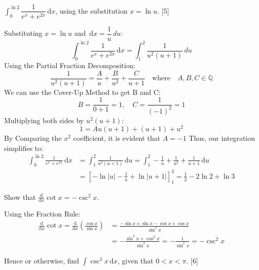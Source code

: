 \documentclass[12pt, a4 paper]{article}
\begin{document}
\begin{outline}[enumerate]
\begin{answer}
\begin{align*}
		\end{align*}
	\end{answer}
	\2 $\int_0^{\ln2} \dfrac{1}{e^x+e^{2x}}\,\mathrm{d}x$, using the substitution $x = \ln u$. \hfill[5]
	\begin{answer}
		Substituting $x=\ln u$ and $\,\mathrm{d}x = \dfrac{1}{u} \,du$:
		\begin{equation*}
			\int_0^{\ln2} \frac{1}{e^x+e^{2x}}\,\mathrm{d}x = \int_1^2 \frac{1}{u^2(u+1)}\,du
		\end{equation*}
		Using the Partial Fraction Decomposition:
		\begin{equation*}
			\frac{1}{u^2(u+1)} = \frac{A}{u} + \frac{B}{u^2} + \frac{C}{u+1} \quad \textrm{where} \quad A,B,C\in\mathbb{Q}
		\end{equation*}
		We can use the Cover-Up Method to get B and C:
		\begin{equation*}
			B = \frac{1}{0+1}=1, \quad C = \frac{1}{(-1)^2} = 1
		\end{equation*}
		Multiplying both sides by $u^2(u+1)$:
		\begin{equation*}
			1 = Au(u+1) + (u+1) + u^2
		\end{equation*}
		By Comparing the $x^2$ coefficient, it is evident that $A=-1$ Thus, our integration simplifies to:
		\begin{align*}
			\int_0^{\ln2} \frac{1}{e^x+e^{2x}}\,\mathrm{d}x & = \int_1^2 \frac{1}{u^2(u+1)}\,\mathrm{d}u =\int_1^2 -\frac{1}{u} + \frac{1}{u^2} + \frac{1}{u+1} \,\mathrm{d}u \\
			                                                & = [-\ln{|u|}-\frac{1}{u}+\ln{|u+1|}]_1^2 = \frac{1}{2}-2\ln{2}+\ln{3}
		\end{align*}
	\end{answer}
	\1 Show that ${\frac{\mathrm{d}}{\mathrm{d}x}}\cot{x}= -\csc^2x$.\\
	\begin{answer}
		Using the Fraction Rule:
		\begin{align*}
			{\frac{\mathrm{d}}{\mathrm{d}x}}\cot{x} = {\frac{\mathrm{d}}{\mathrm{d}x}}(\frac{\cos x}{\sin x}) & = \frac{-\sin x \times \sin x - \cos x \times \cos x}{\sin^2 x}          \\
			                                                                                                  & = -\frac{\sin^2 x + \cos^2 x}{\sin^2 x} = -\frac{1}{\sin^2 x} = -\csc^2x
		\end{align*}
	\end{answer}
	Hence or otherwise, find $\int \csc^3x\,\mathrm{d}x$, given that $0<x<\pi$. \hfill[6]

\end{outline}
\end{document}

